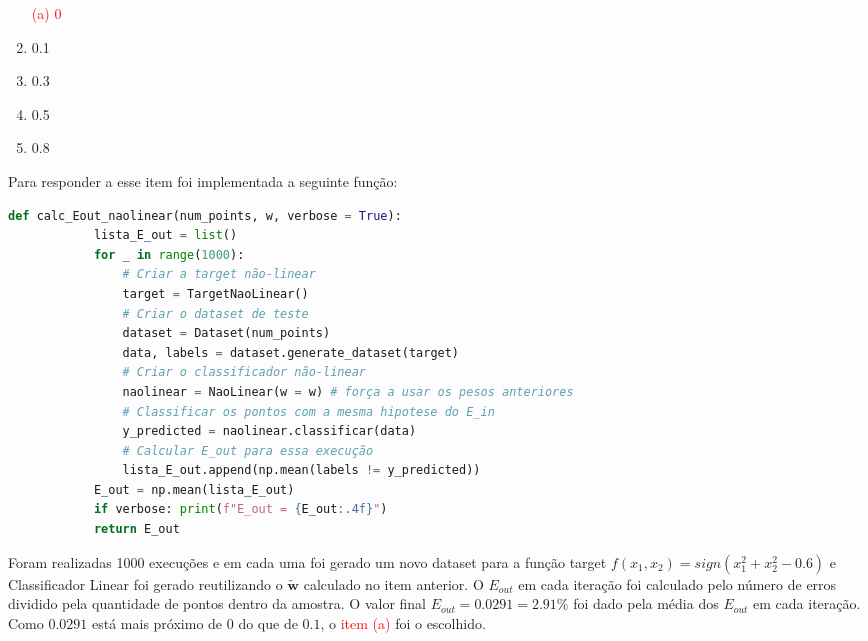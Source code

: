 \begin{enumerate}
    \begin{enumerate}
        \item [\textcolor{red}{(a)}]\textcolor{red}{0}\addtocounter{enumii}{1}
        \item 0.1
        \item 0.3
        \item 0.5
        \item 0.8
    \end{enumerate}

    Para responder a esse item foi implementada a seguinte função:

    \begin{lstlisting}[language=Python, caption=Cálculo do E\_out para a Regressão Não-Linear, label=cod:calc_E_out_naolinear]
        def calc_Eout_naolinear(num_points, w, verbose = True):
            lista_E_out = list()
            for _ in range(1000):
                # Criar a target não-linear
                target = TargetNaoLinear()
                # Criar o dataset de teste
                dataset = Dataset(num_points)
                data, labels = dataset.generate_dataset(target)
                # Criar o classificador não-linear
                naolinear = NaoLinear(w = w) # força a usar os pesos anteriores
                # Classificar os pontos com a mesma hipotese do E_in
                y_predicted = naolinear.classificar(data)
                # Calcular E_out para essa execução
                lista_E_out.append(np.mean(labels != y_predicted))
            E_out = np.mean(lista_E_out)
            if verbose: print(f"E_out = {E_out:.4f}")
            return E_out
    \end{lstlisting}

    Foram realizadas 1000 execuções e em cada uma foi gerado um novo dataset para a função target $f(x_1,x_2) = sign(x_1^2 + x_2^2 - 0.6) $ e Classificador Linear foi gerado reutilizando o $\tilde{\boldsymbol{w}}$ calculado no item anterior. O $E_{out}$ em cada iteração foi calculado pelo número de erros dividido pela quantidade de pontos dentro da amostra. O valor final $E_{out} = 0.0291 = 2.91\%$ foi dado pela média dos $E_{out}$ em cada iteração. Como $0.0291$ está mais próximo de $0$ do que de $0.1$, o \textcolor{red}{item (a)} foi o escolhido.

\end{enumerate}


